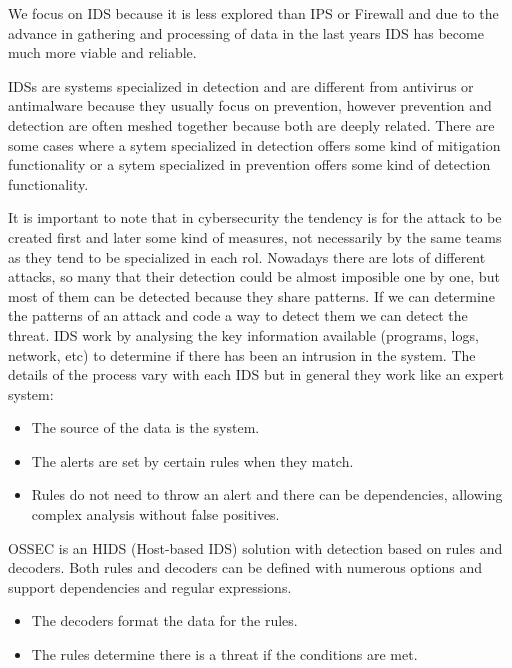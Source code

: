 \linej
\linej
We focus on IDS because it is less explored than IPS or Firewall and due to the advance in gathering and processing of data in the last years IDS has become much more viable and reliable.

\linej
\linej
IDSs are systems specialized in detection and are different from antivirus or antimalware because they usually focus on prevention, however prevention and detection are often meshed together because both are deeply related. There are some cases where a sytem specialized in detection offers some kind of mitigation functionality or a sytem specialized in prevention offers some kind of detection functionality.

\linej
\linej
It is important to note that in cybersecurity the tendency is for the attack to be created first and later some kind of measures, not necessarily by the same teams as they tend to be specialized in each rol. Nowadays there are lots of different attacks, so many that their detection could be almost imposible one by one, but most of them can be detected because they share patterns. If we can determine the patterns of an attack and code a way to detect them we can detect the threat.
\linej
IDS work by analysing the key information available (programs, logs, network, etc) to determine if there has been an intrusion in the system. The details of the process vary with each IDS but in general they work like an expert system:
\begin{itemize}
	\item The source of the data is the system.
	\item The alerts are set by certain rules when they match.
	\item Rules do not need to throw an alert and there can be dependencies, allowing complex analysis without false positives.
\end{itemize}
\linej
OSSEC is an HIDS (Host-based IDS) solution with detection based on rules and decoders. Both rules and decoders can be defined with numerous options and support dependencies and regular expressions.
\begin{itemize}
	\item The decoders format the data for the rules.
	\item The rules determine there is a threat if the conditions are met.
\end{itemize}

